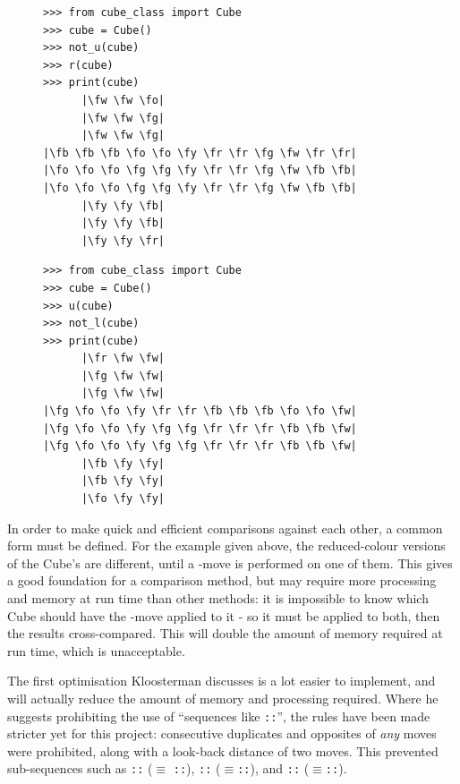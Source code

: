 \documentclass{report}
\newcommand{\tit}[1]{\textit{#1}}
\newcommand{\movesequence}[1]{\uppercase{\texttt{:\formatmoves{#1}:}}}
\newcommand{\move}[1]{\uppercase{\texttt{\formatmovesnospace{#1}}}-move}
\newcommand{\fw}{\color{gray}W }
\newcommand{\fo}{\color{orange}O }
\newcommand{\fg}{\color{green}G }
\newcommand{\fr}{\color{red}R }
\newcommand{\fb}{\color{blue}B }
\newcommand{\fy}{\color{yellow}Y }
\begin{document}
	
	\begin{figure}[H]
		\centering
		\begin{minipage}{0.4\textwidth}
			\begin{lstlisting}[caption={Performing sequence $A$}, label={lst:reflection1}]
>>> from cube_class import Cube
>>> cube = Cube()
>>> not_u(cube)
>>> r(cube)
>>> print(cube)
      |\fw \fw \fo|
      |\fw \fw \fg|
      |\fw \fw \fg|
|\fb \fb \fb \fo \fo \fy \fr \fr \fg \fw \fr \fr|
|\fo \fo \fo \fg \fg \fy \fr \fr \fg \fw \fb \fb|
|\fo \fo \fo \fg \fg \fy \fr \fr \fg \fw \fb \fb|
      |\fy \fy \fb|
      |\fy \fy \fb|
      |\fy \fy \fr|\end{lstlisting}
		\end{minipage}%
		\hspace{10mm}
		\begin{minipage}{0.4\textwidth}
			\begin{lstlisting}[caption={Perform $A$'s reflection, $A'$}, label={lst:reflection2}]
>>> from cube_class import Cube
>>> cube = Cube()
>>> u(cube)
>>> not_l(cube)
>>> print(cube)
      |\fr \fw \fw|
      |\fg \fw \fw|
      |\fg \fw \fw|
|\fg \fo \fo \fy \fr \fr \fb \fb \fb \fo \fo \fw|
|\fg \fo \fo \fy \fg \fg \fr \fr \fr \fb \fb \fw|
|\fg \fo \fo \fy \fg \fg \fr \fr \fr \fb \fb \fw|
      |\fb \fy \fy|
      |\fb \fy \fy|
      |\fo \fy \fy|\end{lstlisting}\end{minipage}\end{figure}
	In order to make quick and efficient comparisons against each other, a common form must be defined. For the example given above, the reduced-colour versions of the Cube's are different, until a \move{y2} is performed on one of them. This gives a good foundation for a comparison method, but may require more processing and memory at run time than other methods: it is impossible to know which Cube should have the \move{y2} applied to it - so it must be applied to both, then the results cross-compared. This will double the amount of memory required at run time, which is unacceptable.
	
	The first optimisation Kloosterman discusses is a lot easier to implement, and will actually reduce the amount of memory and processing required. Where he suggests prohibiting the use of \enquote{sequences like \movesequence{r2l2r2}}, the rules have been made stricter yet for this project: consecutive duplicates and opposites of \tit{any} moves were prohibited, along with a look-back distance of two moves. This prevented sub-sequences such as \movesequence{l.l} ($\equiv$ \movesequence{l2}), \movesequence{l'l} ($\equiv$\movesequence{$\phi$}), and \movesequence{l'r.l} ($\equiv$\movesequence{r}).
	
\end{document}
